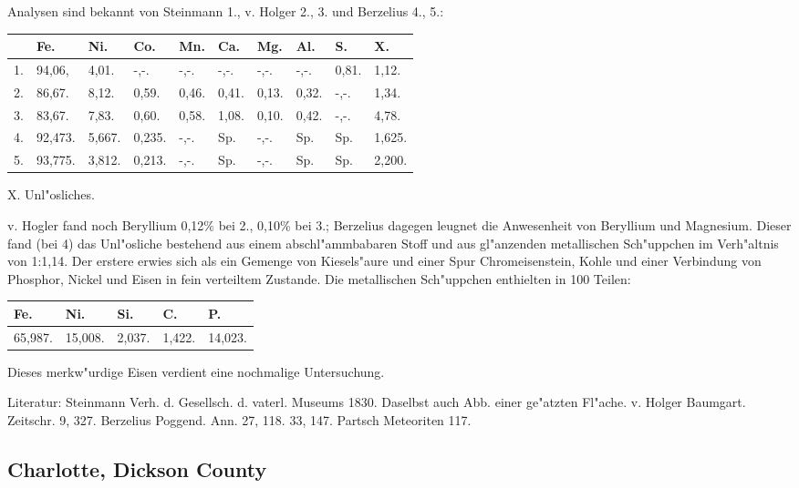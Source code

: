 \documentclass[a4paper, 11pt, oneside]{article}
\begin{document}
Analysen sind bekannt von Steinmann 1., v. Holger 2., 3. und Berzelius 4., 5.:
\begin{table}[H]
    \centering
    \begin{tabular}{l l l l l l l l l l}
         & Fe. & Ni. & Co. & Mn. & Ca. & Mg. & Al. & S. & X. \\ \hline
        1. & 94,06, & 4,01. & -,-. & -,-. & -,-. & -,-. & -,-. & 0,81. & 1,12. \\
        2. & 86,67. & 8,12. & 0,59. & 0,46. & 0,41. & 0,13. & 0,32. & -,-. & 1,34. \\
        3. & 83,67. & 7,83. & 0,60. & 0,58. & 1,08. & 0,10. & 0,42. & -,-. & 4,78. \\
        4. & 92,473. & 5,667. & 0,235. & -,-. & Sp. & -,-. & Sp. & Sp. & 1,625. \\
        5. & 93,775. & 3,812. & 0,213. & -,-. & Sp. & -,-. & Sp. & Sp. & 2,200. \\
    \end{tabular}
\end{table}

X. Unl"osliches.

v. Hogler fand noch Beryllium 0,12\% bei 2., 0,10\% bei 3.; Berzelius dagegen leugnet die Anwesenheit von Beryllium und Magnesium. Dieser fand (bei 4) das Unl"osliche bestehend aus einem abschl"ammbabaren Stoff und aus gl"anzenden metallischen Sch"uppchen im Verh"altnis von 1:1,14. Der erstere erwies sich als ein Gemenge von Kiesels"aure und einer Spur Chromeisenstein, Kohle und einer Verbindung von Phosphor, Nickel und Eisen in fein verteiltem Zustande. Die metallischen Sch"uppchen enthielten in 100 Teilen:
\begin{table}[H]
    \centering
    \begin{tabular}{l l l l l}
        Fe. & Ni. & Si. & C. & P. \\ \hline
        65,987. & 15,008. & 2,037. & 1,422. & 14,023. \\
    \end{tabular}
\end{table}

Dieses merkw"urdige Eisen verdient eine nochmalige Untersuchung.

\footnotesize
Literatur: Steinmann Verh. d. Gesellsch. d. vaterl. Museums 1830. Daselbst auch Abb. einer ge"atzten Fl"ache. v. Holger Baumgart. Zeitschr. 9, 327. Berzelius Poggend. Ann. 27, 118. 33, 147. Partsch Meteoriten 117.

\subsection{Charlotte, Dickson County}
\normalsize
\end{document}
